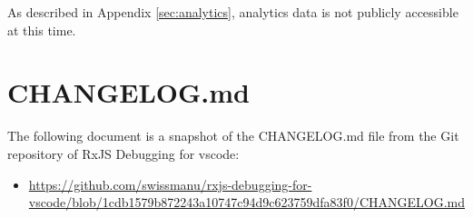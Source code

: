As described in Appendix \ref{sec:analytics}, analytics data is not publicly accessible at this time.




\section{CHANGELOG.md}
\label{sec:changelog}
The following document is a snapshot of the CHANGELOG.md file from the Git repository of RxJS Debugging for vscode:

\begin{itemize}
  \item \url{https://github.com/swissmanu/rxjs-debugging-for-vscode/blob/1cdb1579b872243a10747c94d9c623759dfa83f0/CHANGELOG.md}
\end{itemize}


